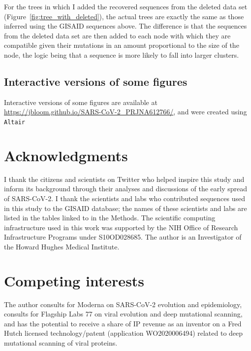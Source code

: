 \documentclass[9pt,twocolumn,twoside]{gsajnl_modified}
\begin{document}
{For the trees in which I added the recovered sequences from the deleted data set (Figure~\ref{fig:tree_with_deleted}), the actual trees are exactly the same as those inferred using the GISAID sequences above.
The difference is that the sequences from the deleted data set are then added to each node with which they are compatible given their mutations in an amount proportional to the size of the node, the logic being that a sequence is more likely to fall into larger clusters.

\subsection{Interactive versions of some figures}
Interactive versions of some figures are available at \url{https://jbloom.github.io/SARS-CoV-2_PRJNA612766/}, and were created using \texttt{Altair}~\citep{vanderplas2018altair}

\section{Acknowledgments}
I thank the citizens and scientists on Twitter who helped inspire this study and inform its background through their analyses and discussions of the early spread of SARS-CoV-2.
I thank the scientists and labs who contributed sequences used in this study to the GISAID database; the names of these scientists and labs are listed in the tables linked to in the Methods.
The scientific computing infrastructure used in this work was supported by the NIH Office of Research Infrastructure Programs under S10OD028685.
The author is an Investigator of the Howard Hughes Medical Institute.

\section{Competing interests}
The author consults for Moderna on SARS-CoV-2 evolution and epidemiology, consults for Flagship Labs 77 on viral evolution and deep mutational scanning, and has the potential to receive a share of IP revenue as an inventor on a Fred Hutch licensed technology/patent (application WO2020006494) related to deep mutational scanning of viral proteins.

}



\clearpage
\onecolumn
\renewcommand{\thepage}{S\arabic{page}}
\setcounter{page}{1}
\renewcommand{\thefigure}{S\arabic{figure}}
\setcounter{figure}{0}
\end{document}
